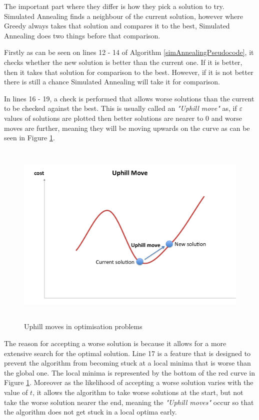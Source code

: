\documentclass[12pt]{report}
\begin{document}
The important part where they differ is how they pick a solution to try. Simulated Annealing finds a neighbour of the current solution, however where Greedy always takes that solution and compares it to the best, Simulated Annealing does two things before that comparison.

Firstly as can be seen on lines 12 - 14 of Algorithm \ref{simAnnealingPseudocode}, it checks whether the new solution is better than the current one. If it is better, then it takes that solution for comparison to the best. However, if it is not better there is still a chance Simulated Annealing will take it for comparison. 

In lines 16 - 19, a check is performed that allows worse solutions than the current to be checked against the best. This is usually called an \textit{"Uphill move"} as, if $\varepsilon$ values of solutions are plotted then better solutions are nearer to 0 and worse moves are further, meaning they will be moving upwards on the curve as can be seen in Figure \ref{uphillMove}.

\begin{figure}[H]
\centering
\includegraphics[width=16cm, height=9cm]{./uphillmove}
\caption{Uphill moves in optimisation problems}
\label{uphillMove}
\end{figure}

The reason for accepting a worse solution is because it allows for a more extensive search for the optimal solution. Line 17 is a feature that is designed to prevent the algorithm from becoming stuck at a local minima that is worse than the global one\cite{simAnnealing}. The local minima is represented by the bottom of the red curve in Figure \ref{uphillMove}. Moreover as the likelihood of accepting a worse solution varies with the value of $t$, it allows the algorithm to take worse solutions at the start, but not take the worse solution nearer the end, meaning the \textit{"Uphill moves"} occur so that the algorithm does not get stuck in a local optima early.
\end{document}
